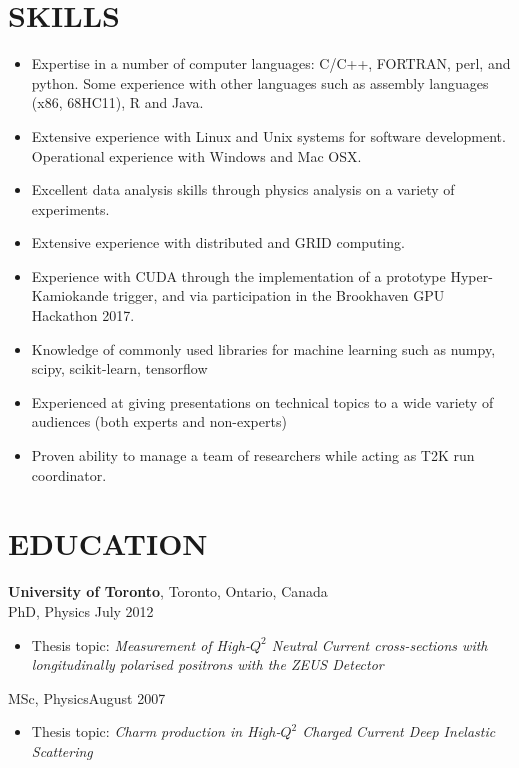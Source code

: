 \documentclass[margin]{res}
\begin{document}
\begin{resume}
\section{SKILLS}
\begin{itemize} \itemsep -2pt
\item Expertise in a number of computer languages: C/C++, FORTRAN, perl, and
python. Some experience with other languages such as assembly languages (x86,
68HC11), R and Java.
\item Extensive experience with Linux and Unix systems for software development. Operational experience with Windows and Mac OSX.
\item Excellent data analysis skills through physics analysis on a variety of experiments.
\item Extensive experience with distributed and GRID computing.
\item Experience with CUDA through the implementation of a prototype Hyper-Kamiokande trigger, and via participation in the Brookhaven GPU Hackathon 2017.
\item Knowledge of commonly used libraries for machine learning such as numpy, scipy, scikit-learn, tensorflow
\item Experienced at giving presentations on technical topics to a wide variety of audiences (both experts and non-experts)
\item Proven ability to manage a team of researchers while acting as T2K run coordinator.
\end{itemize}


\section{EDUCATION}

{\bf University of Toronto}, Toronto, Ontario, Canada \\
PhD, Physics \hfill July 2012
\begin{itemize} \itemsep -2pt  %
\item Thesis topic: \textit{Measurement of High-$Q^2$ Neutral Current cross-sections with longitudinally polarised positrons with the ZEUS Detector}
\end{itemize}

MSc, Physics\hfill August 2007 
\begin{itemize} \itemsep -2pt  %
\item Thesis topic: \textit{Charm production in High-$Q^2$ Charged Current Deep Inelastic Scattering}
\end{itemize}


\end{resume}
\end{document}
